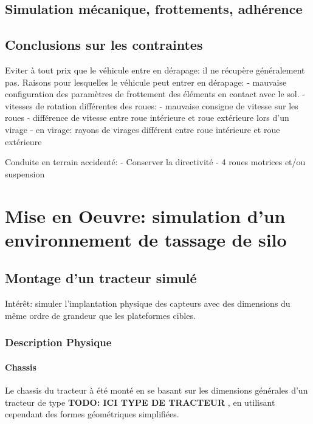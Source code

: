 \documentclass[12pt,a4paper]{report}
\begin{document}
		\subsection{Simulation mécanique, frottements, adhérence}
		\subsection{Conclusions sur les contraintes}
		Eviter à tout prix que le véhicule entre en dérapage: il ne récupère généralement pas.
		Raisons pour lesquelles le véhicule peut entrer en dérapage:
			- mauvaise configuration des paramètres de frottement des éléments en contact avec le sol.
			- vitesses de rotation différentes des roues: 
				- mauvaise consigne de vitesse sur les roues
				- différence de vitesse entre roue intérieure et roue extérieure lors d'un virage
			- en virage: rayons de virages différent entre roue intérieure et roue extérieure
			
		Conduite en terrain accidenté:
			- Conserver la directivité
			- 4 roues motrices et/ou suspension
			
		
	\section{Mise en Oeuvre: simulation d'un environnement de tassage de silo}
		\subsection{Montage d'un tracteur simulé}
		Intérêt: simuler l'implantation physique des capteurs avec des dimensions du même ordre de grandeur que les plateformes cibles.
		
		\subsubsection{Description Physique}
			\paragraph{Chassis}
			Le chassis du tracteur à été monté en se basant sur les dimensions générales d'un tracteur de type \textbf{TODO: ICI TYPE DE TRACTEUR} , en utilisant cependant des formes géométriques simplifiées.
			\newline
			
\end{document}

